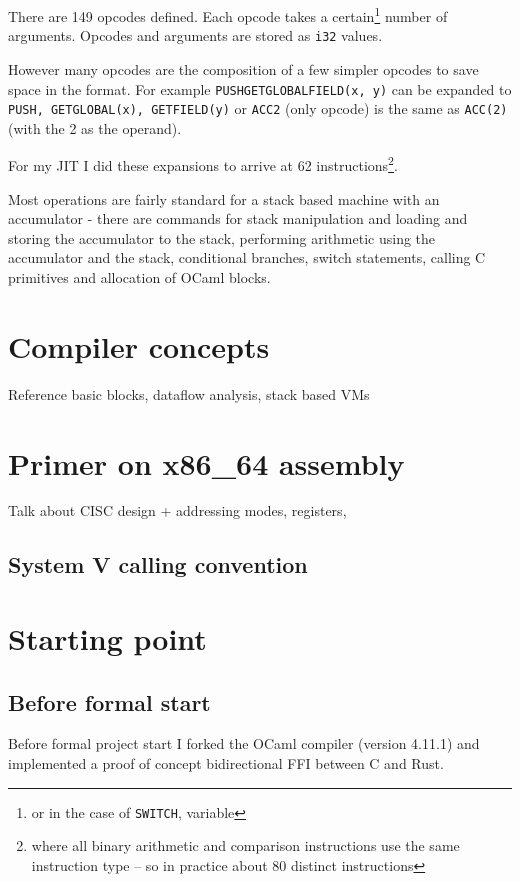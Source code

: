 There are 149 opcodes defined. Each opcode takes a certain\footnote{or in the case of
    \texttt{SWITCH}, variable} number of arguments. Opcodes and arguments are stored as
\texttt{i32}
values.

However many opcodes are the composition of a few simpler opcodes to save space in the
format. For example \texttt{PUSHGETGLOBALFIELD(x, y)} can be expanded to \texttt{PUSH,
    GETGLOBAL(x), GETFIELD(y)} or \texttt{ACC2} (only opcode) is the same as \texttt{ACC(2)} (with
the 2 as the operand).

For my JIT I did these expansions to arrive at 62 instructions\footnote{where all binary
    arithmetic and comparison instructions use the same instruction type -- so in practice about
    80 distinct instructions}.

Most operations are fairly standard for a stack based machine with an accumulator - there are
commands for stack manipulation and loading and storing the accumulator to the stack, performing
arithmetic using the accumulator and the stack,
conditional branches, switch statements, calling C primitives and allocation of OCaml blocks.

\section{Compiler concepts}

Reference basic blocks, dataflow analysis, stack based VMs

\section{Primer on x86\_64 assembly}

Talk about CISC design + addressing modes, registers,

\subsection{System V calling convention}

\section{Starting point}

\subsection{Before formal start}

Before formal project start I forked the OCaml compiler (version 4.11.1) and implemented a proof
of concept bidirectional FFI between C and Rust.


